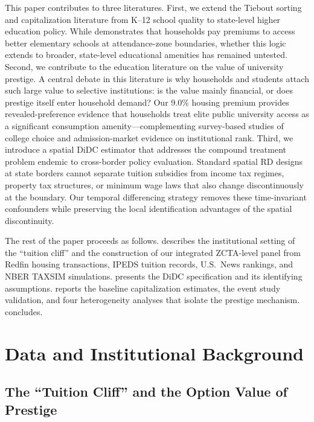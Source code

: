 \documentclass[12pt]{article}
\begin{document}
This paper contributes to three literatures. First, we extend the Tiebout sorting and capitalization literature from K--12 school quality \citep{black1999better} to state-level higher education policy. While \citet{black1999better} demonstrates that households pay premiums to access better elementary schools at attendance-zone boundaries, whether this logic extends to broader, state-level educational amenities has remained untested. Second, we contribute to the education literature on the value of university prestige. A central debate in this literature is why households and students attach such large value to selective institutions: is the value mainly financial, or does prestige itself enter household demand? Our 9.0\% housing premium provides revealed-preference evidence that households treat elite public university access as a significant consumption amenity---complementing survey-based studies of college choice and admission-market evidence on institutional rank. Third, we introduce a spatial DiDC estimator that addresses the compound treatment problem endemic to cross-border policy evaluation. Standard spatial RD designs at state borders cannot separate tuition subsidies from income tax regimes, property tax structures, or minimum wage laws that also change discontinuously at the boundary. Our temporal differencing strategy removes these time-invariant confounders while preserving the local identification advantages of the spatial discontinuity.

The rest of the paper proceeds as follows.  describes the institutional setting of the ``tuition cliff'' and the construction of our integrated ZCTA-level panel from Redfin housing transactions, IPEDS tuition records, U.S.\ News rankings, and NBER TAXSIM simulations.  presents the DiDC specification and its identifying assumptions.  reports the baseline capitalization estimates, the event study validation, and four heterogeneity analyses that isolate the prestige mechanism.  concludes.


\section{Data and Institutional Background}\label{sec:data}

\subsection{The ``Tuition Cliff'' and the Option Value of Prestige}
\end{document}
